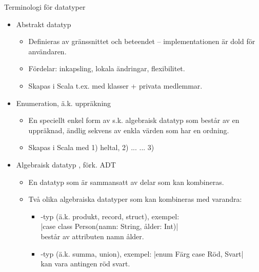 \begin{Slide}{Terminologi för datatyper}\SlideFontSmall
\begin{itemize}
\item Abstrakt datatyp 
\begin{itemize}\SlideFontTiny
\item Definieras av gränssnittet och beteendet -- implementationen är dold för användaren. 
\item Fördelar: inkapsling, lokala ändringar, flexibilitet.
\item Skapas i Scala t.ex. med klasser + privata medlemmar.
\end{itemize} 
\item Enumeration, ä.k. uppräkning 
\begin{itemize}\SlideFontTiny
\item En speciellt enkel form av s.k. algebraisk datatyp som består av en uppräknad, ändlig sekvens av enkla värden som har en ordning.
\item Skapas i Scala med 1) heltal, 2)  ...  ... 3) 
\end{itemize} 
\item Algebraisk datatyp , förk. ADT
\begin{itemize}\SlideFontTiny
\item En datatyp som är sammansatt av delar som kan kombineras. 
\item Två olika algebraiska datatyper som kan kombineras med varandra:
\begin{itemize}\SlideFontTiny
\item {}-typ (ä.k. produkt, record, struct), exempel: \\ \code|case class Person(namn: String, ålder: Int)| \\består av attributen namn  ålder.
\item {}-typ (ä.k. summa, union), exempel: \code|enum Färg { case Röd, Svart}| \\kan vara antingen röd  svart.
\end{itemize}  
\end{itemize} 
\end{itemize}
\end{Slide}

